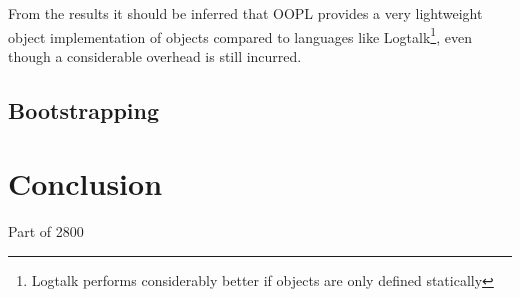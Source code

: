 \documentclass[12pt,a4paper,twoside,openright]{report}
\begin{document}
\bigskip

From the results it should be inferred that OOPL provides a very lightweight object implementation of objects compared to languages like Logtalk\footnote{Logtalk performs considerably better if objects are only defined statically}, even though a considerable overhead is still incurred. 

\section{Bootstrapping}



\chapter{Conclusion}

Part of 2800


{}

\begin{comment}
\appendix


\chapter{Project Proposal}
\end{comment}
\end{document}
